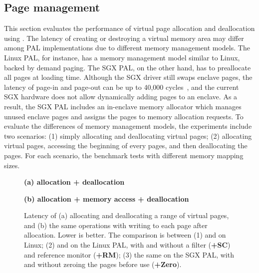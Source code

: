 
\subsection{Page management}
\label{sec:eval:pal:memory}


This section evaluates the performance of virtual page allocation and deallocation
using \thehostabi{}.
The latency of creating or destroying a virtual memory area
may differ among PAL implementations
due to different memory management models.
The Linux PAL, for instance, has a memory management model
similar to Linux,
backed by demand paging.
The SGX PAL, on the other hand, has to preallocate all pages at loading time.
Although the SGX driver still swaps enclave pages,
the latency of page-in and page-out can be up to 40,000 cycles~\cite{orenbach17eleos},
and the current SGX hardware does not allow dynamically adding pages
to an enclave.
As a result, the SGX PAL includes an in-enclave memory allocator
which manages unused enclave pages
and assigns the pages to memory allocation requests.
To evaluate
the differences of memory management models,
the experiments
include two scenarios:
(1) simply allocating and deallocating virtual pages;
(2) allocating virtual pages,
accessing the beginning of every pages,
and then deallocating the pages.
For each scenario,
the benchmark tests with different memory mapping sizes.





\begin{figure*}[t!]
\centering
\footnotesize
{}
\parbox{0.49\textwidth}{\centering\bf (a) allocation + deallocation}
\parbox{0.49\textwidth}{\centering\bf (b) allocation + memory access + deallocation}
\caption{Latency of (a) allocating and deallocating a range of virtual pages, and (b) the same operations with writing to each page after allocation. Lower is better.
The comparison is between (1)  and  on Linux; (2)  and  on the Linux PAL, with and without a \seccomp{} filter ({\bf +SC}) and reference monitor ({\bf +RM}); (3) the same \hostapis{} on the SGX PAL, with and without zeroing the pages before use ({\bf +Zero}).}
\label{fig:eval:pal:mmap-latency}
\end{figure*}


